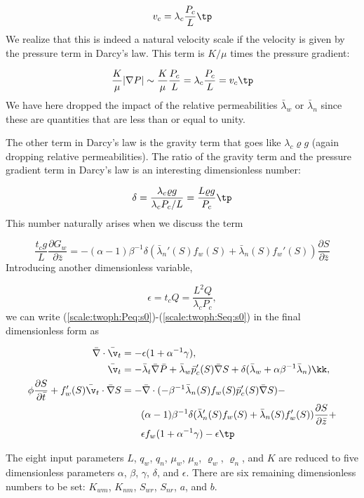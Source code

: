 \documentclass[graybox,envcountchap,sectrefs,final]{svmonodo}
\begin{document}
\[ v_c = \lambda_c\frac{P_c}{L}\tp\]
We realize that this is indeed a natural velocity scale if the
velocity is given by the pressure term in Darcy's law. This term
is $K/\mu$ times the pressure gradient:

\[ \frac{K}{\mu}|\nabla P| \sim \frac{K}{\mu}\frac{P_c}{L} =
\lambda_c\frac{P_c}{L} = v_c\tp\]
We have here dropped the impact of the
relative permeabilities $\bar\lambda_w$ or
$\bar\lambda_n$ since these are quantities that are less than or equal
to unity.

The other term in Darcy's law is the gravity term that goes like
$\lambda_c \varrho g$ (again dropping relative permeabilities).
The ratio of the gravity term and the pressure gradient term in Darcy's
law is an interesting dimensionless number:

\[ \delta = \frac{\lambda_c \varrho g}{\lambda_c P_c/L} =
\frac{L\varrho g}{P_c}\tp\]
This number naturally arises when we discuss
the term

\[ \frac{t_c g}{L}\frac{\partial G_w}{\partial\bar z} =
-(\alpha -1)\beta^{-1}\delta
(\bar\lambda_n'(S)f_w(S) + \bar\lambda_n(S)f_w'(S))
\frac{\partial S}{\partial\bar z}
\]
Introducing another dimensionless variable,

\[ \epsilon = t_cQ = \frac{L^2Q}{\lambda_cP_c},\]
we can write (\ref{scale:twoph:Peq:s0})-(\ref{scale:twoph:Seq:s0}) in the
final dimensionless form as

\begin{align}
\bar\nabla\cdot\bar\v_t &= -\epsilon(1 + \alpha^{-1}\gamma),
\label{scale:twoph:Peq:s}\\ 
\bar\v_t &= -\bar\lambda_t\bar\nabla\bar P +
\bar\lambda_w \bar p_c'(S)\bar\nabla S +
\delta(\bar\lambda_w + \alpha\beta^{-1}\bar\lambda_n)\kk,
\label{scale:twoph:v_teq:s}\\ 
\phi\frac{\partial S}{\partial\bar t} + f_w'(S)\bar\v_t\cdot
\bar\nabla S &= -
\bar\nabla\cdot(-\beta^{-1}\bar\lambda_n(S)f_w(S)\bar p_c'(S)\bar\nabla S) -
\nonumber\\ 
&\quad\quad (\alpha -1)\beta^{-1}\delta
(\bar\lambda_n'(S)f_w(S) + \bar\lambda_n(S)f_w'(S))
\frac{\partial S}{\partial\bar z} +\nonumber\\ 
&\quad\quad\epsilon f_w (1+\alpha^{-1}\gamma) -
\epsilon\tp
\label{scale:twoph:Seq:s}
\end{align}

The eight input parameters $L$, $q_w$, $q_n$, $\mu_w$, $\mu_n$,
$\varrho_w$, $\varrho_n$, and $K$ are reduced to five dimensionless
parameters $\alpha$, $\beta$, $\gamma$, $\delta$, and $\epsilon$.
There are six remaining dimensionless numbers to be set: $K_{wm}$,
$K_{nm}$, $S_{wr}$, $S_{nr}$, $a$, and $b$.
\end{document}
